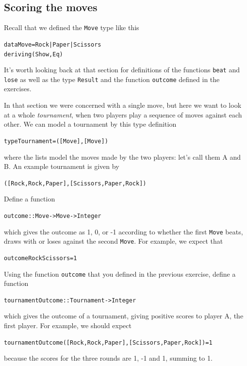 \subsection*{Scoring the moves}

Recall that we defined the \texttt{Move} type like this
\begin{alltt}
data Move = Rock | Paper | Scissors 
            deriving (Show,Eq) 
\end{alltt}
It's worth looking back at that section for definitions of the functions \texttt{beat} and \texttt{lose} as well as the type \texttt{Result} and the function \texttt{outcome} defined in the exercises. 

In that section we were concerned with a single move, but here we want to look at a whole \emph{tournament}, when two players play a sequence of moves against each other.
We can model a tournament by this type definition
\begin{alltt}
type Tournament = ([Move],[Move])
\end{alltt}
where the lists model the moves made by the two players: let's call them A and B. An example tournament is given by
\begin{alltt}
([Rock,Rock,Paper],[Scissors,Paper,Rock])
\end{alltt}

\begin{exercises}

\item
Define a function \label{outcome}
\begin{alltt}
outcome :: Move -> Move -> Integer
\end{alltt}
which gives the outcome as 1, 0, or -1 according to whether the first \texttt{Move} beats, draws with or loses against the second \texttt{Move}. For example, we expect that 
\begin{alltt}
outcome Rock Scissors = 1
\end{alltt}

\item
Using the function \texttt{outcome} that you defined in the previous exercise, define a function
\begin{alltt}
tournamentOutcome :: Tournament -> Integer
\end{alltt}
which gives the outcome of a tournament, giving positive scores to player A, the first player. For example, we should expect
\begin{alltt}
tournamentOutcome ([Rock,Rock,Paper],[Scissors,Paper,Rock]) = 1
\end{alltt}
because the scores for the three rounds are 1, -1 and 1, summing to 1.

\end{exercises}

